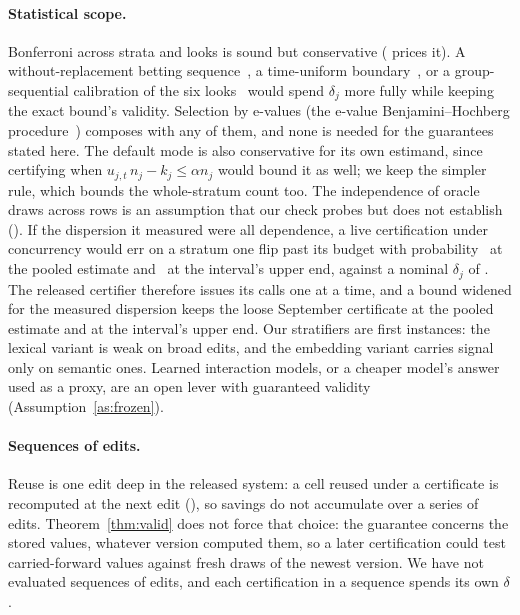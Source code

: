 \keeprunin
\paragraph{Statistical scope.} Bonferroni across strata and looks is
sound but conservative ( prices it). A
without-replacement betting sequence~\cite{wsr}, a time-uniform
boundary~\cite{howard}, or a group-sequential calibration of the six
looks~\cite{pocock,landemets} would spend $\delta_j$ more fully while
keeping the exact bound's validity. Selection by e-values (the
e-value Benjamini--Hochberg procedure~\cite{ebh}) composes with any of
them, and none is needed for the guarantees stated here. The default mode
is also conservative for its own estimand, since certifying when
$u_{j,t}\,n_j - k_j \le \alpha n_j$ would bound it as well; we keep the
simpler rule, which bounds the whole-stratum count too. The independence
of oracle draws across rows is an assumption that our check probes but
does not establish (). If the dispersion it
measured were all dependence, a live certification under concurrency
would err on a stratum one flip past its budget with probability
\overdispPooled\ at the pooled estimate and \overdispPooledUpper\ at the
interval's upper end, against a nominal $\delta_j$ of
\calNominalDelta. The released certifier therefore issues
its calls one at a time, and a bound widened for the measured
dispersion keeps the loose September certificate at the pooled estimate
and at the interval's upper end.
Our stratifiers are first instances: the lexical variant is
weak on broad edits, and the embedding variant carries signal only on
semantic ones. Learned interaction models, or a cheaper model's answer
used as a proxy, are an open lever with guaranteed validity
(Assumption~\ref{as:frozen}).

\keeprunin
\paragraph{Sequences of edits.} Reuse is one edit deep in the released
system: a cell reused under a certificate is recomputed at the next
edit (), so savings do not accumulate over a series of
edits. Theorem~\ref{thm:valid} does not force that choice: the
guarantee concerns the stored values, whatever version computed them, so
a later certification could test carried-forward values against fresh
draws of the newest version. We have not evaluated sequences of edits,
and each certification in a sequence spends its own $\delta$.


